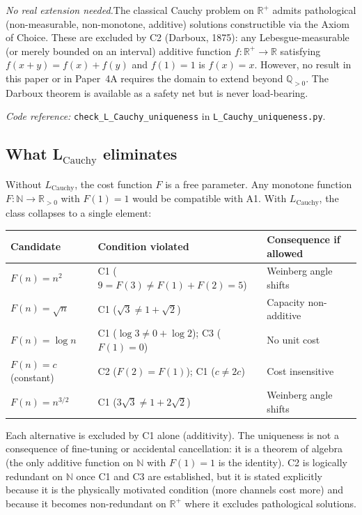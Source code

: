 \documentclass[11pt,a4paper]{article}
\theoremstyle{definition}
\newcommand{\coderef}[2]{\smallskip\noindent\textit{Code reference:} \texttt{#1} in \texttt{#2}.}
\begin{document}
\smallskip\noindent\textit{No real extension needed.}\quad The classical
Cauchy problem on $\mathbb{R}^+$ admits pathological (non-measurable,
non-monotone, additive) solutions constructible via the Axiom of Choice.
These are excluded by C2 (Darboux, 1875): any Lebesgue-measurable (or
merely bounded on an interval) additive function $f: \mathbb{R}^+ \to
\mathbb{R}$ satisfying $f(x+y) = f(x) + f(y)$ and $f(1) = 1$ is
$f(x) = x$.  However, no result in this paper or in Paper~4A requires
the domain to extend beyond $\mathbb{Q}_{>0}$.  The Darboux theorem is
available as a safety net but is never load-bearing.

\coderef{check\_L\_Cauchy\_uniqueness}{L\_Cauchy\_uniqueness.py}


\subsection{What L$_{\mathrm{Cauchy}}$ eliminates}
\label{sec:cauchy_consequences}

Without $L_{\mathrm{Cauchy}}$, the cost function $F$ is a free parameter.
Any monotone function $F: \mathbb{N} \to \mathbb{R}_{>0}$ with $F(1) = 1$
would be compatible with A1.  With $L_{\mathrm{Cauchy}}$, the class
collapses to a single element:

\smallskip
\begin{center}
\small
\begin{tabular}{@{}lll@{}}
\toprule
\textbf{Candidate} & \textbf{Condition violated} & \textbf{Consequence if allowed} \\
\midrule
$F(n) = n^2$ & C1 ($9 = F(3) \ne F(1) + F(2) = 5$) & Weinberg angle shifts \\
$F(n) = \sqrt{n}$ & C1 ($\sqrt{3} \ne 1 + \sqrt{2}$) & Capacity non-additive \\
$F(n) = \log n$ & C1 ($\log 3 \ne 0 + \log 2$); C3 ($F(1) = 0$) & No unit cost \\
$F(n) = c$ (constant) & C2 ($F(2) = F(1)$); C1 ($c \ne 2c$) & Cost insensitive \\
$F(n) = n^{3/2}$ & C1 ($3\sqrt{3} \ne 1 + 2\sqrt{2}$) & Weinberg angle shifts \\
\bottomrule
\end{tabular}
\end{center}

\smallskip\noindent Each alternative is excluded by C1 alone (additivity).
The uniqueness is not a consequence of fine-tuning or accidental
cancellation: it is a theorem of algebra (the only additive function on
$\mathbb{N}$ with $F(1) = 1$ is the identity).  C2 is logically
redundant on $\mathbb{N}$ once C1 and C3 are established, but it is
stated explicitly because it is the physically motivated condition
(more channels cost more) and because it becomes non-redundant on
$\mathbb{R}^+$ where it excludes pathological solutions.
\end{document}
